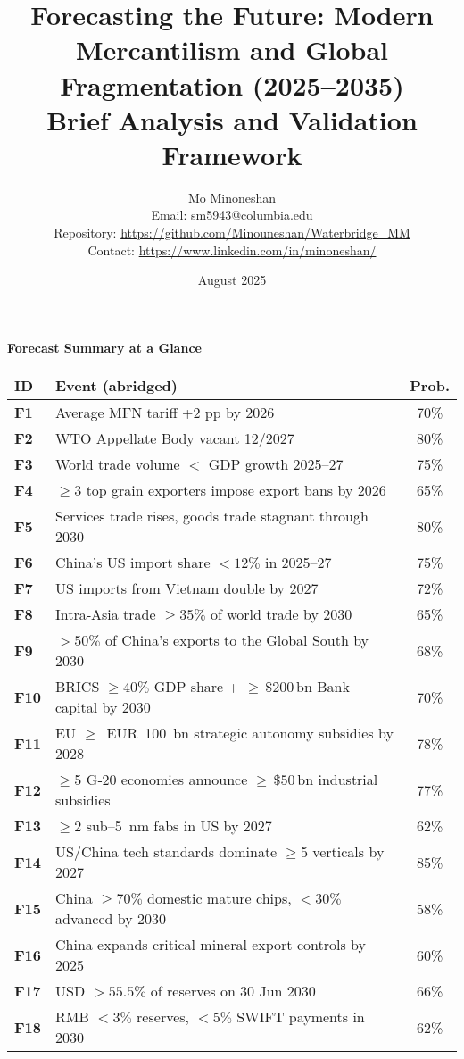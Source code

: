 \documentclass{article}
\title{\textbf{Forecasting the Future: Modern Mercantilism and Global Fragmentation (2025--2035)}\\\Large Brief Analysis and Validation Framework}
\author{Mo Minoneshan\\
\small Email: \href{mailto:sm5943@columbia.edu}{sm5943@columbia.edu}\\
\small Repository: \url{https://github.com/Minouneshan/Waterbridge\_MM}\\
\small Contact: \url{https://www.linkedin.com/in/minoneshan/}}
\date{August 2025}
\newenvironment{landscapetable}{\begin{landscape}\small}{\end{landscape}}
\begin{document}
\maketitle

\tableofcontents


\begin{landscapetable}
\captionsetup{type=table}
\caption*{\bfseries Forecast Summary at a Glance}
\begin{tabularx}{\textwidth}{>{\bfseries}lXc}
\toprule
ID & Event (abridged) & Prob.\\
\midrule
F1 & Average MFN tariff +2 pp by 2026 & 70\%\\
F2 & WTO Appellate Body vacant 12/2027 & 80\%\\
F3 & World trade volume $<$ GDP growth 2025–27 & 75\%\\
F4 & $\geq$3 top grain exporters impose export bans by 2026 & 65\%\\
F5 & Services trade rises, goods trade stagnant through 2030 & 80\%\\
F6 & China’s US import share $<12\%$ in 2025–27 & 75\%\\
F7 & US imports from Vietnam double by 2027 & 72\%\\
F8 & Intra‑Asia trade $\geq 35\%$ of world trade by 2030 & 65\%\\
F9 & $>50\%$ of China’s exports to the Global South by 2030 & 68\%\\
F10 & BRICS $\geq 40\%$ GDP share + $\geq\,\$200\,\mathrm{bn}$ Bank capital by 2030 & 70\%\\
F11 & EU $\geq$ EUR 100 bn strategic autonomy subsidies by 2028 & 78\%\\
F12 & $\geq$5 G‑20 economies announce $\geq\,\$50\,\mathrm{bn}$ industrial subsidies & 77\%\\
F13 & $\geq$2 sub–5 nm fabs in US by 2027 & 62\%\\
F14 & US/China tech standards dominate $\geq$5 verticals by 2027 & 85\%\\
F15 & China $\geq 70\%$ domestic mature chips, $<30\%$ advanced by 2030 & 58\%\\
F16 & China expands critical mineral export controls by 2025 & 60\%\\
F17 & USD $>55.5\%$ of reserves on 30 Jun 2030 & 66\%\\
F18 & RMB $<3\%$ reserves, $<5\%$ SWIFT payments in 2030 & 62\%\\

\end{tabularx}
\end{landscapetable}
\end{document}
